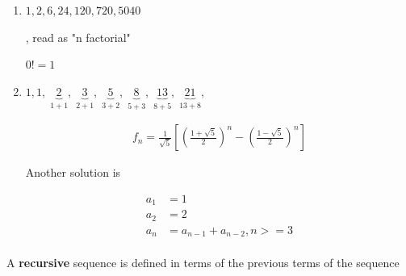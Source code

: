 \documentclass[../../Main.tex]{subfiles}
\begin{document}
\begin{example}
\begin{enumerate}
        \item 
        {
            $
                1, 2, 6, 24, 120, 720, 5040
            $

            , read as "n factorial"

            $0! = 1$
        }

        \item 
        {
            $
                1,
                1,
                \;\underbrace{2}_{1 + 1},
                \;\underbrace{3}_{2 + 1},
                \;\underbrace{5}_{3 + 2},
                \;\underbrace{8}_{5 + 3},
                \;\underbrace{13}_{8 + 5},
                \;\underbrace{21}_{13 + 8},
            $

            \begin{solution}
                \begin{align*}
                    f_n = \frac{1}{\sqrt{5}} \left[ \left(\frac{1 + \sqrt{5}}{2} \right)^n - \left(\frac{1 - \sqrt{5}}{2} \right)^n\right] \tag{We'll derive this later}
                \end{align*}

                Another solution is

                \begin{align*}
                    a_1 &= 1 \\
                    a_2 &= 2 \\
                    a_n &= a_{n-1} + a_{n-2}, n >= 3 \\
                \end{align*}
            \end{solution}
        }
    \end{enumerate}

\end{example}

\begin{definition}
    A \textbf{recursive} sequence is defined in terms of the previous terms of the sequence
\end{definition}
\end{document}

